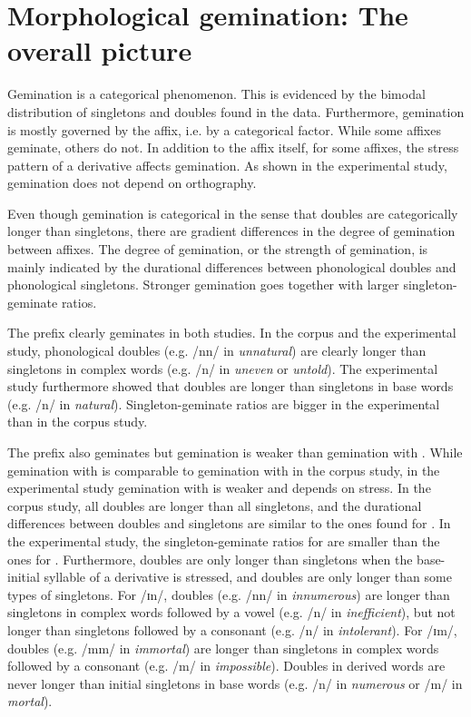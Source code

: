 \section{Morphological gemination: The overall picture}

Gemination is a categorical phenomenon. This is evidenced by the bimodal distribution of singletons and doubles found in the data. Furthermore, gemination is mostly governed by the affix, i.e. by a categorical factor. While some affixes geminate, others do not. In addition to the affix itself, for some affixes, the stress pattern of a derivative affects gemination. 
As shown in the experimental study, gemination does not depend on orthography.

Even though gemination is categorical in the sense that doubles are categorically longer than singletons, there are gradient differences in the degree of gemination between affixes. The degree of gemination, or the strength of gemination, is mainly indicated by the durational differences between phonological doubles and phonological singletons. Stronger gemination goes together with larger singleton-geminate ratios. 


The prefix  clearly geminates in both studies. In the corpus and the experimental study, phonological doubles (e.g. /nn/ in \textit{unnatural}) are clearly longer than singletons in complex words (e.g. /n/ in \textit{uneven} or \textit{untold}). The experimental study furthermore showed that doubles are longer than singletons in base words  (e.g. /n/ in \textit{natural}). Singleton-geminate ratios are bigger in the experimental than in the corpus study.

The prefix  also geminates but gemination is weaker than gemination with . While gemination with  is comparable to gemination with  in the corpus study, in the experimental study gemination with  is weaker and depends on stress. 
 In the corpus study, 
 all doubles are longer than all singletons, and the durational differences between doubles and singletons are similar to the ones found for . 
In the experimental study, 
the singleton-geminate ratios for  are smaller than the ones for .
Furthermore, doubles are only longer than singletons when the base-initial syllable of a derivative is stressed, and doubles are only longer than some types of singletons. For /ɪn/, doubles (e.g. /nn/ in \textit{innumerous}) are longer than singletons in complex words followed by a vowel (e.g. /n/ in \textit{inefficient}), but not longer than singletons followed by a consonant (e.g. /n/ in \textit{intolerant}). For /ɪm/, doubles (e.g. /mm/ in \textit{immortal}) are longer than singletons in complex words followed by a consonant (e.g. /m/ in \textit{impossible}). Doubles in derived words are never longer than initial singletons in base words (e.g. /n/ in \textit{numerous} or /m/ in \textit{mortal}). 




